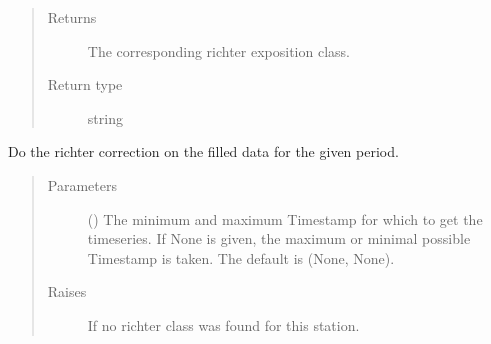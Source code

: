 \documentclass[letterpaper,10pt,english]{sphinxmanual}
\begin{document}
\begin{fulllineitems}
\begin{fulllineitems}
\begin{quote}
\begin{description}
\item[{Returns}] \leavevmode
\sphinxAtStartPar
The corresponding richter exposition class.

\item[{Return type}] \leavevmode
\sphinxAtStartPar
string

\end{description}\end{quote}

\end{fulllineitems}


\begin{fulllineitems}
\label{\detokenize{weatherDB:weatherDB.station.PrecipitationStation.richter_correct}}
\sphinxAtStartPar
Do the richter correction on the filled data for the given period.
\begin{quote}\begin{description}
\item[{Parameters}] \leavevmode
\sphinxAtStartPar
{} ({\hyperref[\detokenize{weatherDB.lib:weatherDB.lib.utils.TimestampPeriod}]{}}\sphinxstyleliteralemphasis{\sphinxupquote{(}}\sphinxstyleliteralemphasis{\sphinxupquote{)}}\sphinxstyleliteralemphasis{\sphinxupquote{, }}) \textendash{} The minimum and maximum Timestamp for which to get the timeseries.
If None is given, the maximum or minimal possible Timestamp is taken.
The default is (None, None).

\item[{Raises}] \leavevmode
\sphinxAtStartPar
{} \textendash{} If no richter class was found for this station.

\end{description}\end{quote}


\end{fulllineitems}
\end{fulllineitems}
\end{document}
